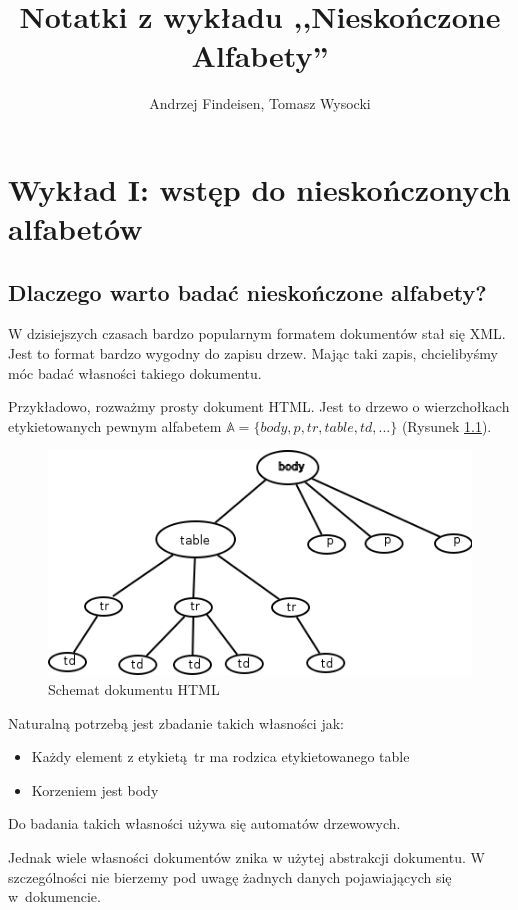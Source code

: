 \documentclass[a4paper,12pt]{report}
\title{Notatki z wykładu ,,Nieskończone Alfabety''}
\author{Andrzej Findeisen, Tomasz Wysocki}
\begin{document}
\maketitle
\newpage
\tableofcontents
\newpage
\chapter {Wykład I: wstęp do nieskończonych alfabetów}
\section {Dlaczego warto badać nieskończone alfabety?}

W dzisiejszych czasach bardzo popularnym formatem dokumentów stał się XML.
Jest to format bardzo wygodny do zapisu drzew.
Mając taki zapis, chcielibyśmy móc badać własności takiego dokumentu.

Przykładowo, rozważmy prosty dokument HTML.
Jest to drzewo o wierzchołkach etykietowanych pewnym alfabetem $ \mathbb{A} = \{body, p, tr, table, td, ... \}$ (Rysunek \ref{html}).
\begin{figure}
\begin{center}
\includegraphics{images/html.png}
\end{center}
\caption{Schemat dokumentu HTML}
\label{html}
\end{figure}

Naturalną potrzebą jest zbadanie takich własności jak:
\begin{itemize}
\item Każdy element z etykietą~tr ma rodzica etykietowanego table
\item Korzeniem jest body
\end{itemize}
Do badania takich własności używa się automatów drzewowych.

Jednak wiele własności dokumentów znika w użytej abstrakcji dokumentu.
W szczególności nie bierzemy pod uwagę żadnych danych pojawiających się w~dokumencie.
\end{document}
